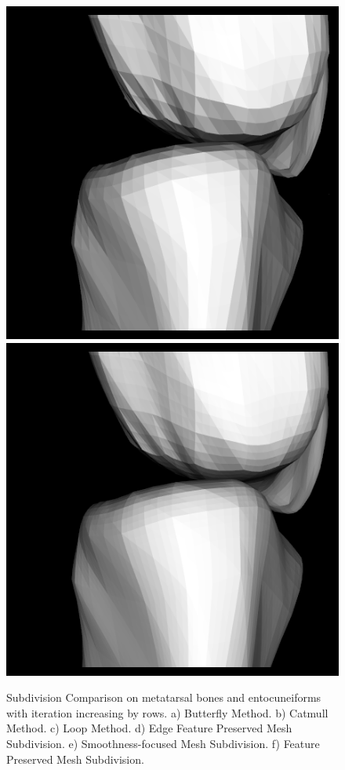 \documentclass[10pt, conference, compsocconf]{IEEEtran}
\begin{document}
\begin{figure}[htbp]
{\begin{minipage}[h]{0.16\linewidth}
        \includegraphics[width=\textwidth]{./Figure/footbones/end/kpw2.png}\\
        \includegraphics[width=\textwidth]{./Figure/footbones/end/kpw3.png}\vspace{1ex}\\
      \end{minipage}
  }

  \caption{Subdivision Comparison on metatarsal bones and entocuneiforms with iteration increasing by rows. a) Butterfly Method. b) Catmull Method. c) Loop Method. d) Edge Feature Preserved Mesh Subdivision. e) Smoothness-focused Mesh Subdivision. f) Feature Preserved Mesh Subdivision.}\label{Figure_KFPMS_3}
\end{figure}
\end{document}
